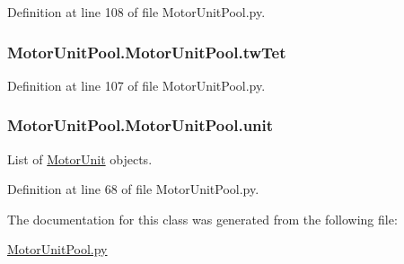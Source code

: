 Definition at line 108 of file Motor\-Unit\-Pool.\-py.

\hypertarget{class_motor_unit_pool_1_1_motor_unit_pool_a785a769c5b4824603a24339e4f0d8dfe}{
\subsubsection[{tw\-Tet}]{\setlength{\rightskip}{0pt plus 5cm}Motor\-Unit\-Pool.\-Motor\-Unit\-Pool.\-tw\-Tet}}\label{class_motor_unit_pool_1_1_motor_unit_pool_a785a769c5b4824603a24339e4f0d8dfe}


Definition at line 107 of file Motor\-Unit\-Pool.\-py.

\hypertarget{class_motor_unit_pool_1_1_motor_unit_pool_a1b14c831606c27efae62f1468850393b}{
\subsubsection[{unit}]{\setlength{\rightskip}{0pt plus 5cm}Motor\-Unit\-Pool.\-Motor\-Unit\-Pool.\-unit}}\label{class_motor_unit_pool_1_1_motor_unit_pool_a1b14c831606c27efae62f1468850393b}


List of \hyperlink{namespace_motor_unit}{Motor\-Unit} objects. 



Definition at line 68 of file Motor\-Unit\-Pool.\-py.



The documentation for this class was generated from the following file\-:\begin{DoxyCompactItemize}
\item 
\hyperlink{_motor_unit_pool_8py}{Motor\-Unit\-Pool.\-py}\end{DoxyCompactItemize}
